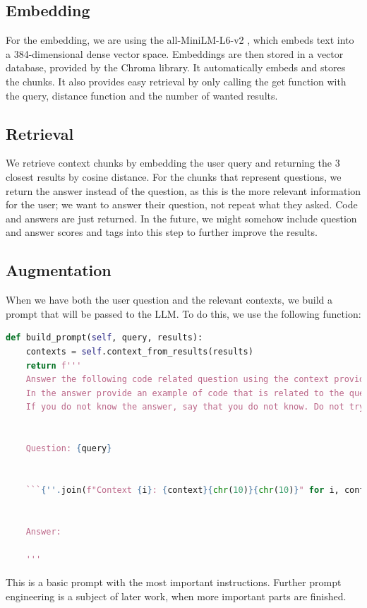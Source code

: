 \documentclass[fleqn,moreauthors,10pt]{ds_report}
\begin{document}
\subsection*{Embedding}
For the embedding, we are using the all-MiniLM-L6-v2 \cite{miniLM}, which embeds text into a 384-dimensional dense vector space. Embeddings are then stored in a vector database, provided by the Chroma \cite{chroma} library. It automatically embeds and stores the chunks. It also provides easy retrieval by only calling the get function with the query, distance function and the number of wanted results. 

\subsection*{Retrieval}
We retrieve context chunks by embedding the user query and returning the 3 closest results by cosine distance. For the chunks that represent questions, we return the answer instead of the question, as this is the more relevant information for the user; we want to answer their question, not repeat what they asked. Code and answers are just returned. In the future, we might somehow include question and answer scores and tags into this step to further improve the results.

\subsection*{Augmentation}
When we have both the user question and the relevant contexts, we build a prompt that will be passed to the LLM. To do this, we use the following function:
\begin{lstlisting}[language=Python]
def build_prompt(self, query, results):
    contexts = self.context_from_results(results)
    return f'''
    Answer the following code related question using the context provided inside triple qoutes in it is useful.
    In the answer provide an example of code that is related to the question.
    If you do not know the answer, say that you do not know. Do not try to invent the solution.
        

    Question: {query}


    ```{''.join(f"Context {i}: {context}{chr(10)}{chr(10)}" for i, context in enumerate(contexts))}```

        
    Answer:

    '''
\end{lstlisting}
This is a basic prompt with the most important instructions. Further prompt engineering is a subject of later work, when more important parts are finished.
\end{document}
